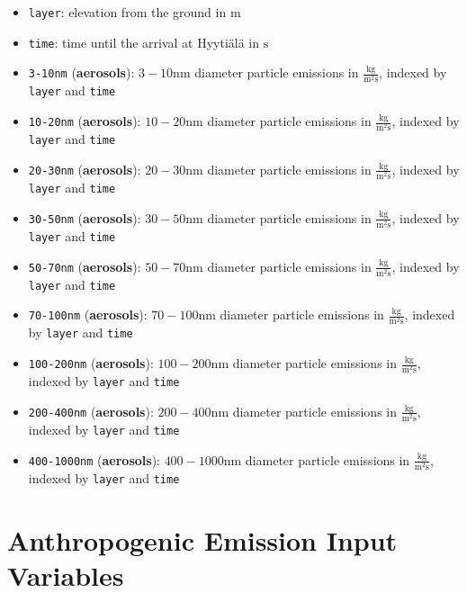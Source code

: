 \begin{itemize}
    \item \texttt{layer}: elevation from the ground in $\text{m}$
    \item \texttt{time}: time until the arrival at Hyyti\"al\"a in $\text{s}$
    \item \texttt{3-10nm} (\textbf{aerosols}): $3-10\text{nm}$ diameter particle emissions in $\frac{\text{kg}}{\text{m}^2 \text{s}}$, indexed by \texttt{layer} and \texttt{time}
    \item \texttt{10-20nm} (\textbf{aerosols}): $10-20\text{nm}$ diameter particle emissions in $\frac{\text{kg}}{\text{m}^2 \text{s}}$, indexed by \texttt{layer} and \texttt{time}
    \item \texttt{20-30nm} (\textbf{aerosols}): $20-30\text{nm}$ diameter particle emissions in $\frac{\text{kg}}{\text{m}^2 \text{s}}$, indexed by \texttt{layer} and \texttt{time}
    \item \texttt{30-50nm} (\textbf{aerosols}): $30-50\text{nm}$ diameter particle emissions in $\frac{\text{kg}}{\text{m}^2 \text{s}}$, indexed by \texttt{layer} and \texttt{time}
    \item \texttt{50-70nm} (\textbf{aerosols}): $50-70\text{nm}$ diameter particle emissions in $\frac{\text{kg}}{\text{m}^2 \text{s}}$, indexed by \texttt{layer} and \texttt{time}
    \item \texttt{70-100nm} (\textbf{aerosols}): $70-100\text{nm}$ diameter particle emissions in $\frac{\text{kg}}{\text{m}^2 \text{s}}$, indexed by \texttt{layer} and \texttt{time}
    \item \texttt{100-200nm} (\textbf{aerosols}): $100-200\text{nm}$ diameter particle emissions in $\frac{\text{kg}}{\text{m}^2 \text{s}}$, indexed by \texttt{layer} and \texttt{time}
    \item \texttt{200-400nm} (\textbf{aerosols}): $200-400\text{nm}$ diameter particle emissions in $\frac{\text{kg}}{\text{m}^2 \text{s}}$, indexed by \texttt{layer} and \texttt{time}
    \item \texttt{400-1000nm} (\textbf{aerosols}): $400-1000\text{nm}$ diameter particle emissions in $\frac{\text{kg}}{\text{m}^2 \text{s}}$, indexed by \texttt{layer} and \texttt{time}
\end{itemize}

\section{Anthropogenic Emission Input Variables}

